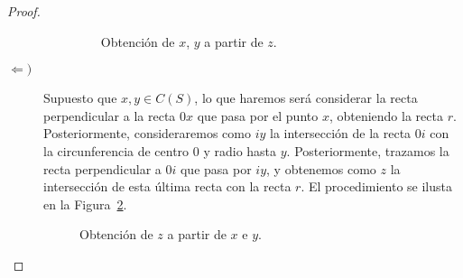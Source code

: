 \begin{lema}
\begin{proof}
\begin{description}
\begin{itemize}
\begin{figure}
\begin{tikzpicture}
                            \end{tikzpicture}
                            \caption{Obtención de $x$, $y$ a partir de $z$.} 
                            \label{fig:conseguir_xy}
                        \end{figure}
                \end{itemize}
            \item [$\Longleftarrow )$] Supuesto que $x,y\in C(S)$, lo que haremos será considerar la recta perpendicular a la recta $0x$ que pasa por el punto $x$, obteniendo la recta $r$. Posteriormente, consideraremos como $iy$ la intersección de la recta $0i$ con la circunferencia de centro $0$ y radio hasta $y$. Posteriormente, trazamos la recta perpendicular a $0i$ que pasa por $iy$, y obtenemos como $z$ la intersección de esta última recta con la recta $r$. El procedimiento se ilusta en la Figura~\ref{fig:conseguir_z}.
                \begin{figure}
                    \centering
                    \caption{Obtención de $z$ a partir de $x$ e $y$.}
                    \label{fig:conseguir_z}
                \end{figure}
        \end{description}
    \end{proof}
\end{lema}

